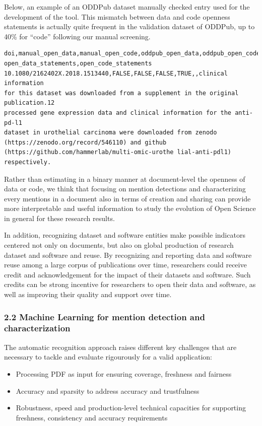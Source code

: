 \documentclass[
]{article}
\providecommand{\tightlist}{%
  \setlength{\itemsep}{0pt}\setlength{\parskip}{0pt}}
\begin{document}
Below, an example of an ODDPub dataset manually checked entry used for
the development of the tool. This mismatch between data and code
openness statements is actually quite frequent in the validation dataset
of ODDPub, up to 40\% for ``code'' following our manual screening.

\begin{verbatim}
doi,manual_open_data,manual_open_code,oddpub_open_data,oddpub_open_code,
open_data_statements,open_code_statements
10.1080/2162402X.2018.1513440,FALSE,FALSE,FALSE,TRUE,,clinical information 
for this dataset was downloaded from a supplement in the original publication.12 
processed gene expression data and clinical information for the anti-pd-l1 
dataset in urothelial carcinoma were downloaded from zenodo 
(https://zenodo.org/record/546110) and github 
(https://github.com/hammerlab/multi-omic-urothe lial-anti-pdl1) respectively.
\end{verbatim}

Rather than estimating in a binary manner at document-level the openness
of data or code, we think that focusing on mention detections and
characterizing every mentions in a document also in terms of creation
and sharing can provide more interpretable and useful information to
study the evolution of Open Science in general for these research
results.

In addition, recognizing dataset and software entities make possible
indicators centered not only on documents, but also on global production
of research dataset and software and reuse. By recognizing and reporting
data and software reuse among a large corpus of publications over time,
researchers could receive credit and acknowledgement for the impact of
their datasets and software. Such credits can be strong incentive for
researchers to open their data and software, as well as improving their
quality and support over time.

\hypertarget{machine-learning-for-mention-detection-and-characterization-1}{%
\subsubsection{2.2 Machine Learning for mention detection and
characterization}\label{machine-learning-for-mention-detection-and-characterization-1}}

The automatic recognition approach raises different key challenges that
are necessary to tackle and evaluate rigourously for a valid
application:

\begin{itemize}
\tightlist
\item
  Processing PDF as input for ensuring coverage, freshness and fairness
\item
  Accuracy and sparsity to address accuracy and trustfulness
\item
  Robustness, speed and production-level technical capacities for
  supporting freshness, consistency and accuracy requirements
\end{itemize}
\end{document}
